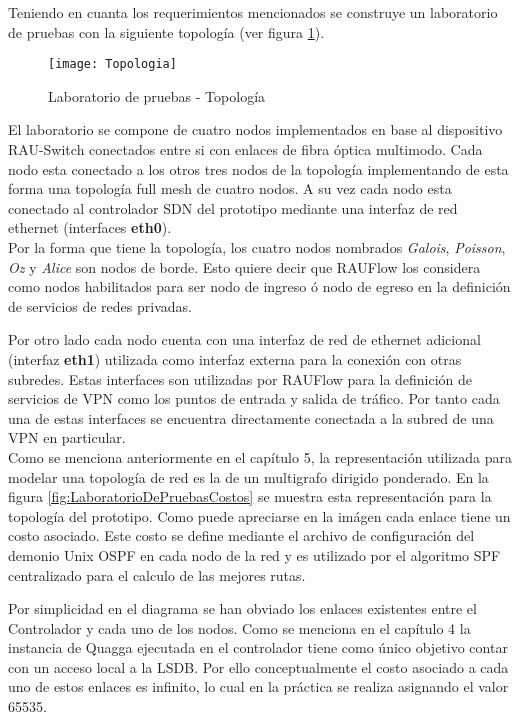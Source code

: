 Teniendo en cuanta los requerimientos mencionados se construye un laboratorio de pruebas con la siguiente topolog\'ia (ver figura \ref{fig:LaboratorioDePruebasTopo}).
  
\begin{figure}[ht!] 
\centering    
\texttt{[image: Topologia]}
\caption[Laboratorio de pruebas - Topolog\'ia]{Laboratorio de pruebas - Topolog\'ia}
\label{fig:LaboratorioDePruebasTopo}
\end{figure}

El laboratorio se compone de cuatro nodos implementados en base al dispositivo RAU-Switch conectados entre si con enlaces de fibra \'optica multimodo. Cada nodo esta conectado a los otros tres nodos de la topolog\'ia implementando de esta forma una topolog\'ia full mesh de cuatro nodos. A su vez cada nodo esta conectado al controlador SDN del prototipo mediante una interfaz de red ethernet (interfaces \textbf{eth0}).\\

Por la forma que tiene la topolog\'ia, los cuatro nodos nombrados \textit{Galois}, \textit{Poisson}, \textit{Oz} y \textit{Alice} son nodos de borde. Esto quiere decir que RAUFlow los considera como nodos habilitados para ser nodo de ingreso \'o nodo de egreso en la definici\'on de servicios de redes privadas.

Por otro lado cada nodo cuenta con una interfaz de red de ethernet adicional (interfaz \textbf{eth1}) utilizada como interfaz externa para la conexi\'on con otras subredes. Estas interfaces son utilizadas por RAUFlow para la definici\'on de servicios de VPN como los puntos de entrada y salida de tr\'afico. Por tanto cada una de estas interfaces se encuentra directamente conectada a la subred de una VPN en particular.\\  

Como se menciona anteriormente en el cap\'itulo 5, la representaci\'on utilizada para modelar una topolog\'ia de red es la de un multigrafo dirigido ponderado. En la figura \ref{fig:LaboratorioDePruebasCostos} se muestra esta representaci\'on para la topolog\'ia del prototipo. Como puede apreciarse en la im\'agen cada enlace tiene un costo asociado. Este costo se define mediante el archivo de configuraci\'on del demonio Unix OSPF en cada nodo de la red y es utilizado por el algoritmo SPF centralizado para el calculo de las mejores rutas.

Por simplicidad en el diagrama se han obviado los enlaces existentes entre el Controlador y cada uno de los nodos. Como se menciona en el cap\'itulo 4 la instancia de Quagga ejecutada en el controlador tiene como \'unico objetivo contar con un acceso local a la LSDB. Por ello conceptualmente el costo asociado a cada uno de estos enlaces es infinito, lo cual en la pr\'actica se realiza asignando el valor 65535.  

